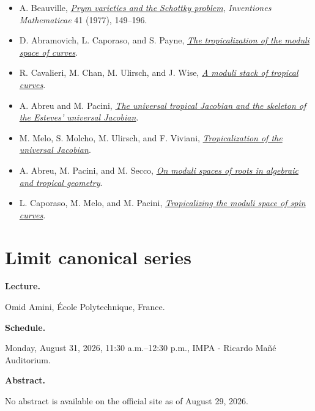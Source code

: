 \begin{itemize}

\item A. Beauville,
\href{%
https://doi.org/%
10.1007/BF01418373%
}{{\it Prym varieties and the Schottky
problem}},
{\it Inventiones Mathematicae} 41
(1977), 149--196.

\item D. Abramovich, L. Caporaso,
and S. Payne,
\href{%
https://arxiv.org/abs/%
1212.0373%
}{{\it The tropicalization of the moduli
space of curves}}.

\item R. Cavalieri, M. Chan,
M. Ulirsch, and J. Wise,
\href{%
https://arxiv.org/abs/%
1704.03806%
}{{\it A moduli stack of tropical
curves}}.

\item A. Abreu and M. Pacini,
\href{%
https://arxiv.org/abs/%
1806.05527%
}{{\it The universal tropical Jacobian
and the skeleton of the Esteves' universal
Jacobian}}.

\item M. Melo, S. Molcho, M. Ulirsch,
and F. Viviani,
\href{%
https://arxiv.org/abs/%
2108.04711%
}{{\it Tropicalization of the universal
Jacobian}}.

\item A. Abreu, M. Pacini,
and M. Secco,
\href{%
https://arxiv.org/abs/%
2204.13471%
}{{\it On moduli spaces of roots in
algebraic and tropical geometry}}.

\item L. Caporaso, M. Melo,
and M. Pacini,
\href{%
https://arxiv.org/abs/%
1902.07803%
}{{\it Tropicalizing the moduli space of
spin curves}}.

\end{itemize}

\section{Limit canonical series}
\label{section-limit-canonical-series}

\medskip\noindent
{\bf Lecture.}

Omid Amini,
\'Ecole Polytechnique, France.

\medskip\noindent
{\bf Schedule.}

Monday, August 31, 2026,
11:30 a.m.--12:30 p.m.,
IMPA - Ricardo Ma\~n\'e Auditorium.

\medskip\noindent
{\bf Abstract.}

No abstract is available on the official
site as of August 29, 2026.

